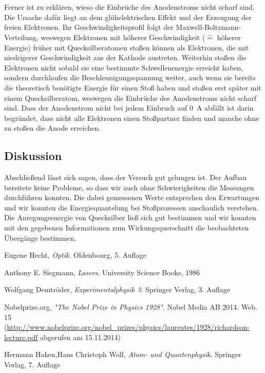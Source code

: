 \documentclass[11pt, a4paper]{article}
\begin{document}
\\
\\
Ferner ist zu erklären, wieso die Einbrüche des Anodenstroms nicht scharf sind.
Die Ursache dafür liegt an dem glühelektrischen Effekt und der Erzeugung der freien Elektronen.
Ihr Geschwindigkeitsprofil folgt der Maxwell-Boltzmann-Verteilung, weswegen Elektronen mit höherer Geschwindigkeit ($\widehat{=}$ höherer Energie) früher mit Quecksilberatomen stoßen können als Elektronen, die mit niedrigerer Geschwindigkeit aus der Kathode austreten.
Weiterhin stoßen die Elektronen nicht sobald sie eine bestimmte Schwellenenergie erreicht haben, sondern durchlaufen die Beschleunigungsspannung weiter, auch wenn sie bereits die theoretisch benötigte Energie für einen Stoß haben und stoßen erst später mit einem Quecksilberatom, weswegen die Einbrüche des Anodenstroms nicht scharf sind.
Dass der Anodenstrom nicht bei jedem Einbruch auf \SI{0}{\ampere} abfällt ist darin begründet, dass nicht alle Elektronen einen Stoßpartner finden und manche ohne zu stoßen die Anode erreichen. 

\subsection{Diskussion}

Abschließend lässt sich sagen, dass der Versuch gut gelungen ist.
Der Aufbau bereitete keine Probleme, so dass wir auch ohne Schwierigkeiten die Messungen durchführen konnten.
Die dabei gemessenen Werte entsprechen den Erwartungen und wir konnten die Energiequantelung bei Stoßprozessen anschaulich verstehen.
Die Anregungsenergie von Quecksilber ließ sich gut bestimmen und wir konnten mit den gegebenen Informationen zum Wirkungsquerschnitt die beobachteten Übergänge bestimmen.

\FloatBarrier


\begin{thebibliography}{9}

	Eugene Hecht,
	\emph{Optik}.
	Oldenbourg,
	5. Auflage
	
	Anthony E. Siegmann,
	\emph{Lasers}.
	University Science Books,
	1986
	
	Wolfgang Demtröder,
	\emph{Experimentalphysik 3}.
	Springer Verlag,
	3. Auflage

 Nobelprize.org,
 \emph{"The Nobel Prize in Physics 1928"}.
 Nobel Media AB 2014. Web. 15\\
 (\url{http://www.nobelprize.org/nobel_prizes/physics/laureates/1928/richardson-lecture.pdf} abgerufen am 15.11.2014)
 
	Hermann Haken,Hans Christoph Wolf,
	\emph{Atom- und Quantenphysik}.
	Springer Verlag,
	7. Auflage
 
\end{thebibliography}
\end{document}
